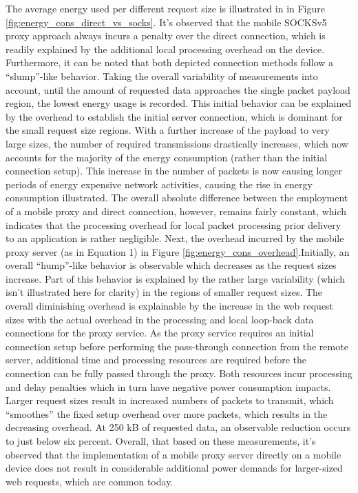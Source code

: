 The average energy used per different request size is illustrated in in Figure \ref*{fig:energy_cons_direct_vs_socks}. It's observed that the mobile SOCKSv5 proxy approach always incurs a penalty
over the direct connection, which is readily explained by the
additional local processing overhead on the device. Furthermore,
it can be noted that both depicted connection methods follow
a “slump”-like behavior. Taking the overall variability of
measurements into account, until the amount of requested data
approaches the single packet payload region, the lowest energy
usage is recorded. This initial behavior can be explained
by the overhead to establish the initial server connection,
which is dominant for the small request size regions. With
a further increase of the payload to very large sizes, the
number of required transmissions drastically increases, which
now accounts for the majority of the energy consumption
(rather than the initial connection setup). This increase in the
number of packets is now causing longer periods of energy expensive
network activities, causing the rise in energy consumption
illustrated. The overall absolute difference between
the employment of a mobile proxy and direct connection,
however, remains fairly constant, which indicates that the
processing overhead for local packet processing prior delivery
to an application is rather negligible.
Next, the overhead incurred by the mobile
proxy server (as in Equation 1) in Figure \ref{fig:energy_cons_overhead}.Initially,
an overall “hump”-like behavior is observable which decreases as
the request sizes increase. Part of this behavior is explained
by the rather large variability (which isn't illustrated
here for clarity) in the regions of smaller request sizes. The overall diminishing overhead is explainable by the increase in the web request sizes with the actual overhead in the
processing and local loop-back data connections for the proxy
service. As the proxy service requires an initial connection
setup before performing the pass-through connection from the
remote server, additional time and processing resources are
required before the connection can be fully passed through
the proxy. Both resources incur processing and delay penalties
which in turn have negative power consumption impacts.
Larger request sizes result in increased numbers of packets
to transmit, which “smoothes” the fixed setup overhead over
more packets, which results in the decreasing overhead. At
250 kB of requested data, an observable reduction occurs to just below
six percent. Overall, that based on these measurements, it's observed that the implementation of a mobile proxy server directly on a
mobile device does not result in considerable additional power
demands for larger-sized web requests, which are common
today.

